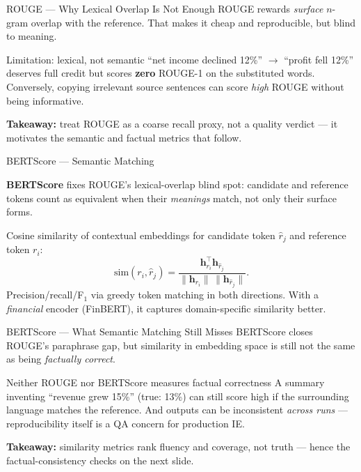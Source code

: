 \documentclass[9pt,t]{beamer}
\begin{document}
\begin{frame}{ROUGE --- Why Lexical Overlap Is Not Enough}
ROUGE rewards \emph{surface} $n$-gram overlap with the reference. That makes it
cheap and reproducible, but blind to meaning.

\medskip
\begin{alertblock}{Limitation: lexical, not semantic}
``net income declined 12\%'' $\to$ ``profit fell 12\%'' deserves full credit but
scores \textbf{zero} ROUGE-1 on the substituted words. Conversely, copying
irrelevant source sentences can score \emph{high} ROUGE without being informative.
\end{alertblock}

\medskip
\textbf{Takeaway:} treat ROUGE as a coarse recall proxy, not a quality verdict ---
it motivates the semantic and factual metrics that follow.
\end{frame}

\begin{frame}{BERTScore --- Semantic Matching}
\begin{bigpicture}
\textbf{BERTScore} fixes ROUGE's lexical-overlap blind spot: candidate and
reference tokens count as equivalent when their \emph{meanings} match, not only
their surface forms.
\end{bigpicture}

\begin{underhood}
Cosine similarity of contextual embeddings for candidate token $\hat r_j$ and
reference token $r_i$:
\[
\mathrm{sim}(r_i,\hat r_j)=
\frac{\mathbf{h}_{r_i}^\top \mathbf{h}_{\hat r_j}}
{\|\mathbf{h}_{r_i}\|\,\|\mathbf{h}_{\hat r_j}\|}.
\]
Precision/recall/F$_1$ via greedy token matching in both directions. With a
\emph{financial} encoder (FinBERT), it captures domain-specific similarity better.
\end{underhood}
\end{frame}

\begin{frame}{BERTScore --- What Semantic Matching Still Misses}
BERTScore closes ROUGE's paraphrase gap, but similarity in embedding space is
still not the same as being \emph{factually correct}.

\medskip
\begin{alertblock}{Neither ROUGE nor BERTScore measures factual correctness}
A summary inventing ``revenue grew 15\%'' (true: 13\%) can still score high if the
surrounding language matches the reference. And outputs can be inconsistent
\emph{across runs} --- reproducibility itself is a QA concern for production IE.
\end{alertblock}

\medskip
\textbf{Takeaway:} similarity metrics rank fluency and coverage, not truth ---
hence the factual-consistency checks on the next slide.
\end{frame}
\end{document}
